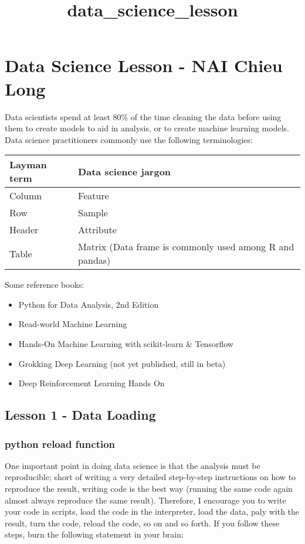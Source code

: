 \documentclass[11pt]{article}
\title{data\_science\_lesson}
\providecommand{\tightlist}{%
      \setlength{\itemsep}{0pt}\setlength{\parskip}{0pt}}
\begin{document}
    
    
    \maketitle
    
    

    
    \section{Data Science Lesson - NAI Chieu
Long}\label{data-science-lesson---nai-chieu-long}

    Data scientists spend at least 80\% of the time cleaning the data before
using them to create models to aid in analysis, or to create machine
learning models. Data science practitioners commonly use the following
terminologies:

\begin{longtable}[c]{@{}ll@{}}
\toprule
Layman term & Data science jargon\tabularnewline
\midrule
\endhead
Column & Feature\tabularnewline
Row & Sample\tabularnewline
Header & Attribute\tabularnewline
Table & Matrix (Data frame is commonly used among R and
pandas)\tabularnewline
\bottomrule
\end{longtable}

    Some reference books:

\begin{itemize}
\tightlist
\item
  Python for Data Analysis, 2nd Edition
\item
  Read-world Machine Learning
\item
  Hands-On Machine Learning with scikit-learn \& Tensorflow
\item
  Grokking Deep Learning (not yet published, still in beta)
\item
  Deep Reinforcement Learning Hands On
\end{itemize}

    \subsection{Lesson 1 - Data Loading}\label{lesson-1---data-loading}

    \subsubsection{python reload function}\label{python-reload-function}

One important point in doing data science is that the analysis must be
reproducible; short of writing a very detailed step-by-step instructions
on how to reproduce the result, writing code is the best way (running
the same code again almost always reproduce the same result). Therefore,
I encourage you to write your code in scripts, load the code in the
interpreter, load the data, paly with the result, turn the code, reload
the code, so on and so forth. If you follow these steps, burn the
following statement in your brain:
\end{document}
